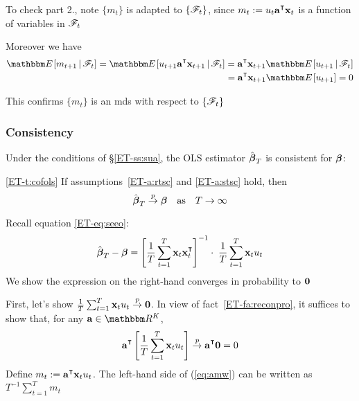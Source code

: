 \begin{frame}
    
    \vspace{2em}
    To check part 2., note $\{m_t\}$ is adapted to $\{\mathscr F_t\}$, since 
    $m_t := u_t \bolda^\T \boldx_t$ is a function of variables in $\mathscr F_t$
    
    Moreover we have
    \begin{align*}
        \EE[ m_{t+1} \given \fF_t ]
        = \EE[ u_{t+1} \bolda^\T \boldx_{t+1} \given \fF_t ]
        = \bolda^\T \boldx_{t+1} \EE[ u_{t+1}  \given \fF_t ]
        \\ = \bolda^\T \boldx_{t+1} \EE[ u_{t+1} ]
        = 0
    \end{align*}
    
    This confirms $\{m_t\}$ is an {\sc mds}
    with respect to $\{\mathscr F_t\}$
    
\end{frame}

\begin{frame}\frametitle{Consistency}

    \vspace{2em}
    Under the conditions of \S\ref{ET-ss:sua}, the OLS estimator
    $\hat {\boldsymbol \beta}_T$ is consistent for ${\boldsymbol \beta}$:
    
    \vspace{.7em}
    \Thm
        \eqref{ET-t:cofols}
        If assumptions~\ref{ET-a:rtsc} and \ref{ET-a:stsc} hold, then 
        \begin{equation*}
            \hat {\boldsymbol \beta}_T \stackrel { p } {\to} {\boldsymbol \beta} \quad \text{as} \quad T \to \infty
        \end{equation*}
        
    
\end{frame}

\begin{frame}

    \vspace{2em}
    \Prf
    Recall equation \eqref{ET-eq:seeo}:
    \begin{equation*}
        \hboldbeta_T - \boldbeta 
        = \left[ \frac{1}{T} \sum_{t=1}^T \boldx_t \boldx_t^\T \right]^{-1} 
            \cdot \; \frac{1}{T} \sum_{t=1}^T \boldx_t u_t
    \end{equation*}
    We show the expression on the right-hand converges in probability to ${\mathbf 0}$
    
    First,
    let's show
        $\frac{1}{T} \sum_{t=1}^T {\mathbf x}_t u_t \stackrel { p } {\to} {\mathbf 0}$. In view of fact~\ref{ET-fa:reconpro}, it
    suffices to show that, for any $\bolda \in \RR^K$,
    \begin{equation}
        \label{eq:amw}
        \bolda^\T \left[ \frac{1}{T} \sum_{t=1}^T \boldx_t u_t \right]
        \toprob \bolda^\T \boldzero = 0
    \end{equation}
    Define $m_t := \bolda^\T \boldx_t u_t$. The left-hand side of
    (\ref{eq:amw}) can be written as $T^{-1} \sum_{t=1}^T m_t$
    
\end{frame}


